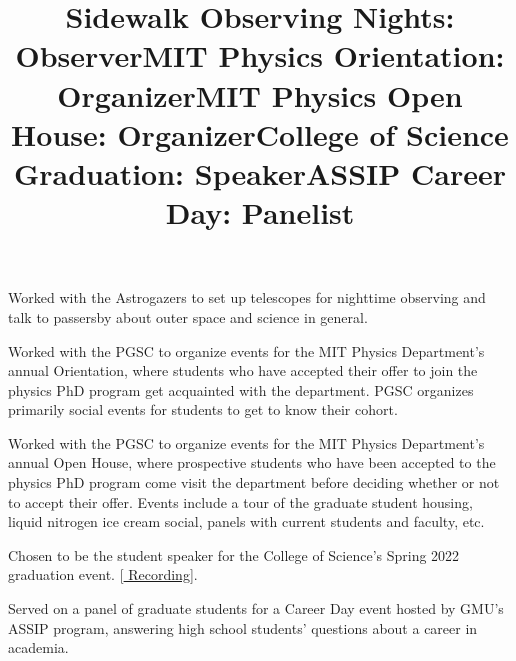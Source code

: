 \documentclass[marg, centered]{res}
\begin{document}
\begin{resume}
\title{\textbf{Sidewalk Observing Nights: Observer}}
\begin{position}
Worked with the Astrogazers to set up telescopes for nighttime observing and talk to passersby about outer space and science in general.
\end{position}

\title{\textbf{MIT Physics Orientation: Organizer}}
\begin{position}
Worked with the PGSC to organize events for the MIT Physics Department's annual Orientation, where students who have accepted their offer to join the physics PhD program get acquainted with the department.  PGSC organizes primarily social events for students to get to know their cohort.
\end{position}


\title{\textbf{MIT Physics Open House: Organizer}}
\begin{position}
Worked with the PGSC to organize events for the MIT Physics Department's annual Open House, where prospective students who have been accepted to the physics PhD program come visit the department before deciding whether or not to accept their offer.  Events include a tour of the graduate student housing, liquid nitrogen ice cream social, panels with current students and faculty, etc.
\end{position}


\title{\textbf{College of Science Graduation: Speaker}}
\begin{position}
Chosen to be the student speaker for the College of Science's Spring 2022 graduation event. [\href{https://www.youtube.com/watch?v=xsyi9sqYH4o}{\color{dkbu} Recording}].
\end{position}

\title{\textbf{ASSIP Career Day: Panelist}}
\begin{position}
Served on a panel of graduate students for a Career Day event hosted by GMU's ASSIP program, answering high school students' questions about a career in academia.
\end{position}


\end{resume}
\end{document}

